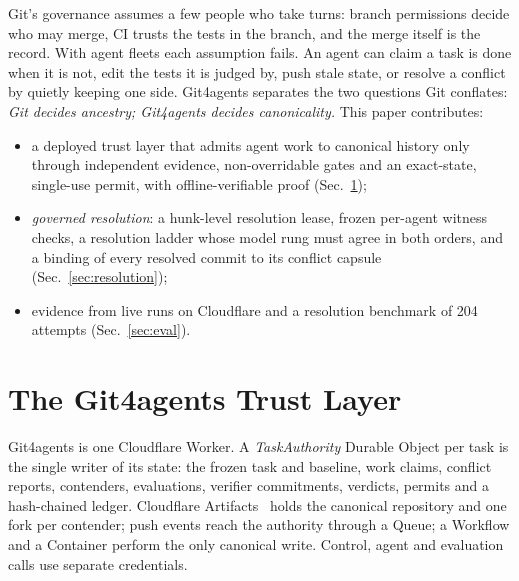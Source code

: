 \documentclass[10pt,conference]{IEEEtran}
\newcommand{\tool}{Git4agents}
\begin{document}
Git's governance assumes a few people who take turns: branch permissions decide who may merge, CI trusts the tests in the branch, and the merge itself is the record. With agent fleets each assumption fails. An agent can claim a task is done when it is not, edit the tests it is judged by, push stale state, or resolve a conflict by quietly keeping one side. \tool{} separates the two questions Git conflates: \emph{Git decides ancestry; \tool{} decides canonicality.} This paper contributes:
\begin{itemize}
\item a deployed trust layer that admits agent work to canonical history only through independent evidence, non-overridable gates and an exact-state, single-use permit, with offline-verifiable proof (Sec.~\ref{sec:tool});
\item \emph{governed resolution}: a hunk-level resolution lease, frozen per-agent witness checks, a resolution ladder whose model rung must agree in both orders, and a binding of every resolved commit to its conflict capsule (Sec.~\ref{sec:resolution});
\item evidence from live runs on Cloudflare and a resolution benchmark of 204 attempts (Sec.~\ref{sec:eval}).
\end{itemize}

\section{The \tool{} Trust Layer}\label{sec:tool}
\tool{} is one Cloudflare Worker. A \emph{TaskAuthority} Durable Object per task is the single writer of its state: the frozen task and baseline, work claims, conflict reports, contenders, evaluations, verifier commitments, verdicts, permits and a hash-chained ledger. Cloudflare Artifacts~\cite{cf-artifacts} holds the canonical repository and one fork per contender; push events reach the authority through a Queue; a Workflow and a Container perform the only canonical write. Control, agent and evaluation calls use separate credentials.
\end{document}
